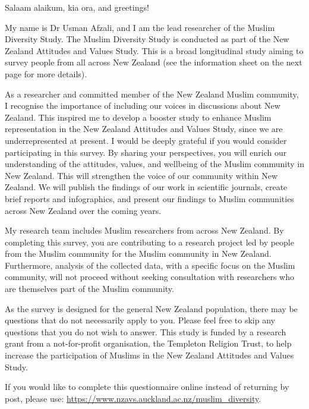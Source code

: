 \documentclass[
]{interact}
\begin{document}
\noindent Salaam alaikum, kia ora, and greetings!

\noindent My name is Dr Usman Afzali, and I am the lead researcher of
the Muslim Diversity Study. The Muslim Diversity Study is conducted as
part of the New Zealand Attitudes and Values Study. This is a broad
longitudinal study aiming to survey people from all across New Zealand
(see the information sheet on the next page for more details).

\noindent As a researcher and committed member of the New Zealand Muslim
community, I recognise the importance of including our voices in
discussions about New Zealand. This inspired me to develop a booster
study to enhance Muslim representation in the New Zealand Attitudes and
Values Study, since we are underrepresented at present. I would be
deeply grateful if you would consider participating in this survey. By
sharing your perspectives, you will enrich our understanding of the
attitudes, values, and wellbeing of the Muslim community in New Zealand.
This will strengthen the voice of our community within New Zealand. We
will publish the findings of our work in scientific journals, create
brief reports and infographics, and present our findings to Muslim
communities across New Zealand over the coming years.

\noindent My research team includes Muslim researchers from across New
Zealand. By completing this survey, you are contributing to a research
project led by people from the Muslim community for the Muslim community
in New Zealand. Furthermore, analysis of the collected data, with a
specific focus on the Muslim community, will not proceed without seeking
consultation with researchers who are themselves part of the Muslim
community.

\noindent As the survey is designed for the general New Zealand
population, there may be questions that do not necessarily apply to you.
Please feel free to skip any questions that you do not wish to answer.
This study is funded by a research grant from a not-for-profit
organisation, the Templeton Religion Trust, to help increase the
participation of Muslims in the New Zealand Attitudes and Values Study.

\begin{tcolorbox}[enhanced jigsaw, toprule=.15mm, opacityback=0, colframe=quarto-callout-color-frame, leftrule=.75mm, colback=white, arc=.35mm, bottomrule=.15mm, breakable, rightrule=.15mm, left=2mm]

If you would like to complete this questionnaire online instead of
returning by post, please use:
\url{https://www.nzavs.auckland.ac.nz/muslim_diversity}.

\end{tcolorbox}
\end{document}
